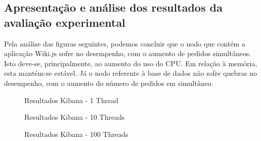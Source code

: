 \documentclass[11pt]{article}
\begin{document}
\subsection{Apresentação e análise dos resultados da avaliação experimental}

Pela análise das figuras seguintes, podemos concluir que o nodo que contém a aplicação Wiki.js sofre no desempenho, com o aumento de pedidos simultâneos. Isto deve-se, principalmente, ao aumento do uso do CPU. Em relação à memória, esta mantém-se estável. Já o nodo referente à base de dados não sofre quebras no desempenho, com o aumento do número de pedidos em simultâneo.

\begin{figure}[H]
    \centering
    \caption {Resultados Kibana - 1 Thread}
\end{figure}

\begin{figure}[H]
    \centering
    \caption {Resultados Kibana - 10 Threads}
\end{figure}

\begin{figure}[H]
    \centering
    \caption {Resultados Kibana - 100 Threads}
\end{figure}
\end{document}
